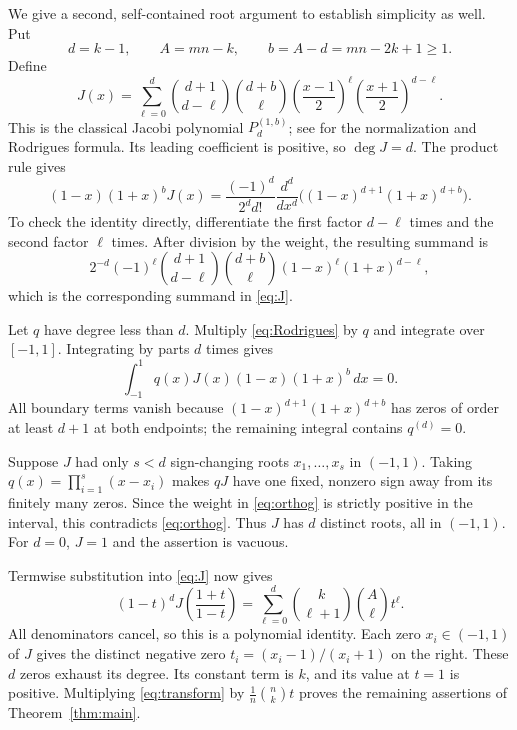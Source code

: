 \documentclass[11pt]{article}
\begin{document}
We give a second, self-contained root argument to establish simplicity
as well. Put
\[
 d=k-1,\qquad A=mn-k,\qquad b=A-d=mn-2k+1\geq1.
\]
Define
\begin{equation}\label{eq:J}
 J(x)=\sum_{\ell=0}^d\binom{d+1}{d-\ell}\binom{d+b}{\ell}
           \left(\frac{x-1}{2}\right)^\ell
           \left(\frac{x+1}{2}\right)^{d-\ell}.
\end{equation}
This is the classical Jacobi polynomial $P_d^{(1,b)}$;
see \cite[Eq.~18.5.8 and Table~18.5.1]{DLMFJacobi} for the normalization
and Rodrigues formula. Its leading coefficient is positive, so $\deg J=d$.
The product rule gives
\begin{equation}\label{eq:Rodrigues}
 (1-x)(1+x)^bJ(x)=\frac{(-1)^d}{2^d d!}
       \frac{d^d}{dx^d}\bigl((1-x)^{d+1}(1+x)^{d+b}\bigr).
\end{equation}
To check the identity directly, differentiate the first factor $d-\ell$
times and the second factor $\ell$ times. After division by the weight,
the resulting summand is
\[
 2^{-d}(-1)^\ell\binom{d+1}{d-\ell}\binom{d+b}{\ell}
                  (1-x)^\ell(1+x)^{d-\ell},
\]
which is the corresponding summand in \eqref{eq:J}.

Let $q$ have degree less than $d$. Multiply \eqref{eq:Rodrigues} by $q$
and integrate over $[-1,1]$. Integrating by parts $d$ times gives
\begin{equation}\label{eq:orthog}
 \int_{-1}^1 q(x)J(x)(1-x)(1+x)^b\,dx=0.
\end{equation}
All boundary terms vanish because
$(1-x)^{d+1}(1+x)^{d+b}$ has zeros of order at least $d+1$ at both
endpoints; the remaining integral contains $q^{(d)}=0$.

Suppose $J$ had only $s<d$ sign-changing roots $x_1,\ldots,x_s$ in
$(-1,1)$. Taking $q(x)=\prod_{i=1}^s(x-x_i)$ makes $qJ$ have one fixed,
nonzero sign away from its finitely many zeros. Since the weight in
\eqref{eq:orthog} is strictly positive in the interval, this contradicts
\eqref{eq:orthog}. Thus $J$ has $d$ distinct roots, all in $(-1,1)$.
For $d=0$, $J=1$ and the assertion is vacuous.

Termwise substitution into \eqref{eq:J} now gives
\begin{equation}\label{eq:transform}
 (1-t)^d J\!\left(\frac{1+t}{1-t}\right)
       =\sum_{\ell=0}^d\binom{k}{\ell+1}\binom A\ell t^\ell.
\end{equation}
All denominators cancel, so this is a polynomial identity. Each zero
$x_i\in(-1,1)$ of $J$ gives the distinct negative zero
$t_i=(x_i-1)/(x_i+1)$ on the right. These $d$ zeros exhaust its degree.
Its constant term is $k$, and its value at $t=1$ is positive.
Multiplying \eqref{eq:transform} by $\frac1n\binom nk t$ proves the
remaining assertions of Theorem~\ref{thm:main}.
\end{document}
